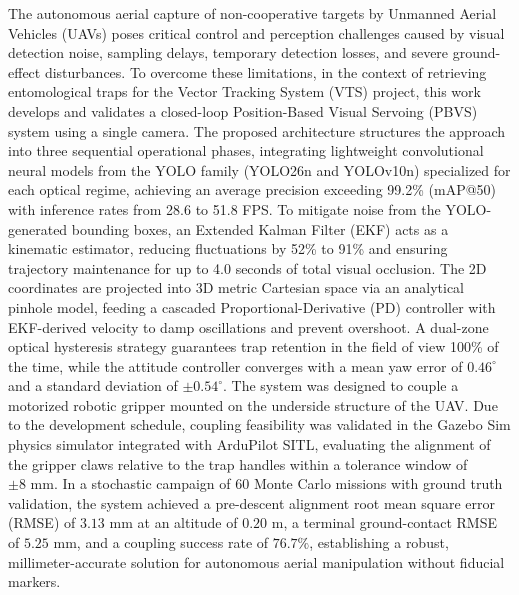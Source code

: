The autonomous aerial capture of non-cooperative targets by Unmanned Aerial Vehicles (UAVs) poses critical control and perception challenges caused by visual detection noise, sampling delays, temporary detection losses, and severe ground-effect disturbances. To overcome these limitations, in the context of retrieving entomological traps for the Vector Tracking System (VTS) project, this work develops and validates a closed-loop Position-Based Visual Servoing (PBVS) system using a single camera. The proposed architecture structures the approach into three sequential operational phases, integrating lightweight convolutional neural models from the YOLO family (YOLO26n and YOLOv10n) specialized for each optical regime, achieving an average precision exceeding 99.2\% (mAP@50) with inference rates from 28.6 to 51.8 FPS. To mitigate noise from the YOLO-generated bounding boxes, an Extended Kalman Filter (EKF) acts as a kinematic estimator, reducing fluctuations by 52\% to 91\% and ensuring trajectory maintenance for up to 4.0 seconds of total visual occlusion. The 2D coordinates are projected into 3D metric Cartesian space via an analytical pinhole model, feeding a cascaded Proportional-Derivative (PD) controller with EKF-derived velocity to damp oscillations and prevent overshoot. A dual-zone optical hysteresis strategy guarantees trap retention in the field of view 100\% of the time, while the attitude controller converges with a mean yaw error of $0.46^\circ$ and a standard deviation of $\pm 0.54^\circ$. The system was designed to couple a motorized robotic gripper mounted on the underside structure of the UAV. Due to the development schedule, coupling feasibility was validated in the Gazebo Sim physics simulator integrated with ArduPilot SITL, evaluating the alignment of the gripper claws relative to the trap handles within a tolerance window of $\pm 8\text{ mm}$. In a stochastic campaign of 60 Monte Carlo missions with ground truth validation, the system achieved a pre-descent alignment root mean square error (RMSE) of $3.13\text{ mm}$ at an altitude of $0.20\text{ m}$, a terminal ground-contact RMSE of $5.25\text{ mm}$, and a coupling success rate of $76.7\%$, establishing a robust, millimeter-accurate solution for autonomous aerial manipulation without fiducial markers.